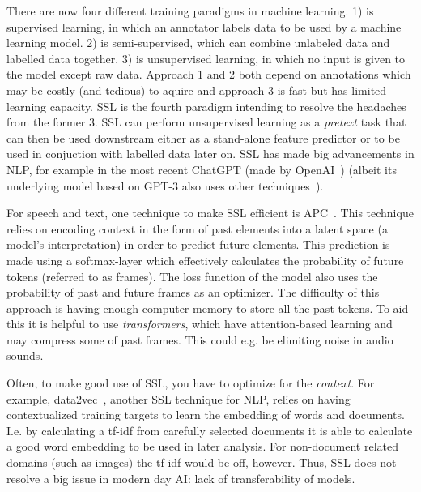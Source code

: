 \documentclass[10pt,twocolumn,letterpaper]{article}
\begin{document}
There are now four different training paradigms in machine learning. 1) is supervised learning, in which an annotator labels data to be used by a machine learning model. 2) is semi-supervised, which can combine unlabeled data and labelled data together. 3) is unsupervised learning, in which no input is given to the model except raw data. Approach 1 and 2 both depend on annotations which may be costly (and tedious) to aquire and approach 3 is fast but has limited learning capacity. \gls{SSL} is the fourth paradigm intending to resolve the headaches from the former 3. \gls{SSL} can perform unsupervised learning as a \textit{pretext} task that can then be used downstream either as a stand-alone feature predictor or to be used in conjuction with labelled data later on. \gls{SSL} has made big advancements in \gls{NLP}, for example in the most recent ChatGPT (made by OpenAI~\cite{openAI}) (albeit its underlying model based on GPT-3 also uses other techniques~\cite{gpt3}).

For speech and text, one technique to make \gls{SSL} efficient is \gls{APC}~\cite{chung2020generative}. This technique relies on encoding context in the form of past elements into a latent space (a model's interpretation) in order to predict future elements. This prediction is made using a softmax-layer which effectively calculates the probability of future tokens (referred to as frames). The loss function of the model also uses the probability of past and future frames as an optimizer. The difficulty of this approach is having enough computer memory to store all the past tokens. To aid this it is helpful to use \textit{transformers}, which have attention-based learning and may compress some of past frames. This could e.g. be elimiting noise in audio sounds.

Often, to make good use of \gls{SSL}, you have to optimize for the \textit{context}. For example, data2vec~\cite{data2vec}, another \gls{SSL} technique for \gls{NLP}, relies on having contextualized training targets to learn the embedding of words and documents. I.e. by calculating a \gls{tf-idf} from carefully selected documents it is able to calculate a good word embedding to be used in later analysis. For non-document related domains (such as images) the \gls{tf-idf} would be off, however. Thus, \gls{SSL} does not resolve a big issue in modern day \gls{AI}: lack of transferability of models.
\end{document}

